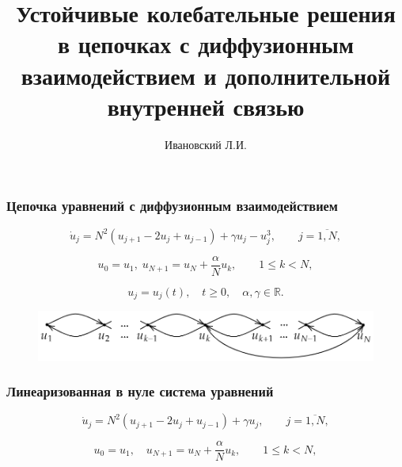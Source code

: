 \documentclass[fullscreen=true, unicode, bookmarks=false]{beamer}
\title[]{ {\huge Устойчивые колебательные решения в цепочках с диффузионным взаимодействием и дополнительной внутренней связью } }
\author[]{{\large Ивановский Л.И.}}
\date{ }
\institute[]
{ Ярославль, ЯрГУ им. П.Г Демидова }
\begin{document}
\begin{frame}
\titlepage
\end{frame} 

\begin{frame}
\frametitle{ Цепочка уравнений с диффузионным взаимодействием }
 
\begin{equation}
	\dot u_j = N^2(u_{j+1} - 2u_j + u_{j-1}) + \gamma u_j - u_j^3, \qquad j = \overline{1, N},
\end{equation}

\begin{equation}
	u_0 = u_1, \; u_{N+1} = u_N + \dfrac{\alpha}{N}u_k, \qquad 1 \leqslant k < N,
\end{equation}

\bigskip

$$ u_j = u_j(t), \quad t \geqslant 0, \quad \alpha, \gamma \in \mathbb{R}. $$

\bigskip
\pause

\begin{figure} 
\includegraphics[scale=0.47]{u_j.png}  
\end{figure}

\end{frame}

\begin{frame}
\frametitle{ Линеаризованная в нуле система уравнений }
 
\begin{equation}
	\dot{u}_j =  N^2(u_{j+1} - 2u_j + u_{j-1}) + \gamma u_j, \qquad j = \overline{1, N},
\end{equation}

\bigskip

\begin{equation}
	u_0 = u_1, \quad u_{N+1} = u_N + \dfrac{\alpha}{N}u_k, \qquad 1 \leqslant k < N,
\end{equation}

\end{frame}
\end{document}
